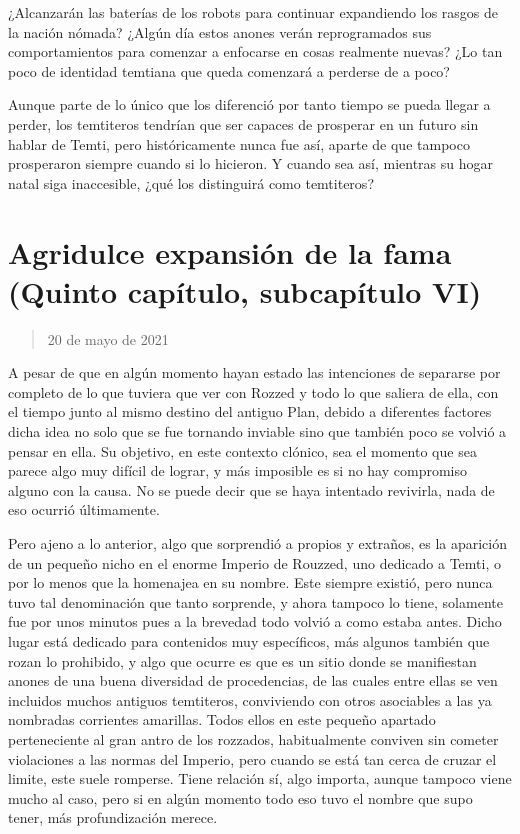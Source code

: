 \documentclass[
  spanish,
]{book}
\begin{document}
¿Alcanzarán las baterías de los robots para continuar expandiendo los rasgos de la nación nómada? ¿Algún día estos anones verán reprogramados sus comportamientos para comenzar a enfocarse en cosas realmente nuevas? ¿Lo tan poco de identidad temtiana que queda comenzará a perderse de a poco?

Aunque parte de lo único que los diferenció por tanto tiempo se pueda llegar a perder, los temtiteros tendrían que ser capaces de prosperar en un futuro sin hablar de Temti, pero históricamente nunca fue así, aparte de que tampoco prosperaron siempre cuando si lo hicieron. Y cuando sea así, mientras su hogar natal siga inaccesible, ¿qué los distinguirá como temtiteros?

\hypertarget{agridulce-expansiuxf3n-de-la-fama-quinto-capuxedtulo-subcapuxedtulo-vi}{%
\section{Agridulce expansión de la fama (Quinto capítulo, subcapítulo VI)}\label{agridulce-expansiuxf3n-de-la-fama-quinto-capuxedtulo-subcapuxedtulo-vi}}

\begin{quote}
20 de mayo de 2021
\end{quote}

A pesar de que en algún momento hayan estado las intenciones de separarse por completo de lo que tuviera que ver con Rozzed y todo lo que saliera de ella, con el tiempo junto al mismo destino del antiguo Plan, debido a diferentes factores dicha idea no solo que se fue tornando inviable sino que también poco se volvió a pensar en ella. Su objetivo, en este contexto clónico, sea el momento que sea parece algo muy difícil de lograr, y más imposible es si no hay compromiso alguno con la causa. No se puede decir que se haya intentado revivirla, nada de eso ocurrió últimamente.

Pero ajeno a lo anterior, algo que sorprendió a propios y extraños, es la aparición de un pequeño nicho en el enorme Imperio de Rouzzed, uno dedicado a Temti, o por lo menos que la homenajea en su nombre. Este siempre existió, pero nunca tuvo tal denominación que tanto sorprende, y ahora tampoco lo tiene, solamente fue por unos minutos pues a la brevedad todo volvió a como estaba antes. Dicho lugar está dedicado para contenidos muy específicos, más algunos también que rozan lo prohibido, y algo que ocurre es que es un sitio donde se manifiestan anones de una buena diversidad de procedencias, de las cuales entre ellas se ven incluidos muchos antiguos temtiteros, conviviendo con otros asociables a las ya nombradas corrientes amarillas. Todos ellos en este pequeño apartado perteneciente al gran antro de los rozzados, habitualmente conviven sin cometer violaciones a las normas del Imperio, pero cuando se está tan cerca de cruzar el limite, este suele romperse. Tiene relación sí, algo importa, aunque tampoco viene mucho al caso, pero si en algún momento todo eso tuvo el nombre que supo tener, más profundización merece.
\end{document}
